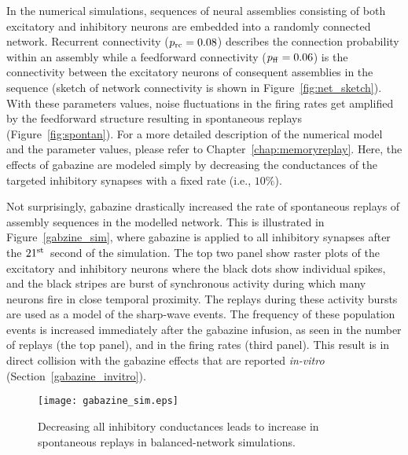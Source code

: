     In the numerical simulations, sequences of neural assemblies consisting of
    both excitatory and inhibitory neurons are embedded into a randomly
    connected network. Recurrent connectivity ($p_{\rm rc}=0.08$) describes the
    connection probability within an assembly while a feedforward connectivity
    ($p_{\rm ff}=0.06$) is the connectivity between the excitatory neurons of
    consequent assemblies in the sequence (sketch of network connectivity is
    shown in Figure~\ref{fig:net_sketch}). With these parameters values, noise
    fluctuations in the firing rates get amplified by the feedforward structure
    resulting in spontaneous replays (Figure~\ref{fig:spontan}). For a more
    detailed description of the numerical model and the parameter values,
    please refer to Chapter~\ref{chap:memoryreplay}. Here, the effects of
    gabazine are modeled simply by decreasing the conductances of the targeted
    inhibitory synapses with a fixed rate (i.e., $10\%$).

    Not surprisingly, gabazine drastically increased the rate of spontaneous
    replays of assembly sequences in the modelled network. This is illustrated
    in Figure~\ref{gabzine_sim}, where gabazine is applied to all inhibitory
    synapses after the $21^{\rm st}$~second of the simulation. The top two
    panel show raster plots of the excitatory and inhibitory neurons where the
    black dots show individual spikes, and the black stripes are burst of
    synchronous activity during which many neurons fire in close temporal
    proximity. The replays during these activity bursts are used as a model of
    the sharp-wave events. The frequency of these population events is
    increased immediately after the gabazine infusion, as seen in the number of
    replays (the top panel), and in the firing rates (third panel). This result
    is in direct collision with the gabazine effects that are reported
    {\textit{in-vitro}} (Section~\ref{gabazine_invitro}).

    \begin{figure}
      \texttt{[image: gabazine\_sim.eps]}
      \caption{Decreasing all inhibitory conductances leads to increase in
        spontaneous replays in balanced-network simulations.
            }
    \label{fig:gabazine_sim}
    \end{figure}

